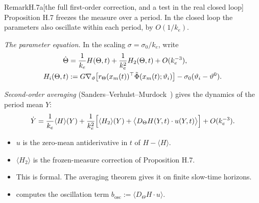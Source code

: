 \begin{rmk}{Remark}{H.7a}[the full first-order correction, and a test in the real closed loop]
Proposition H.7 freezes the measure over a period. In the closed loop the parameters also oscillate within each period,
by $O(1/k_e)$.

\emph{The parameter equation.} In the scaling $\sigma=\sigma_0/k_e$, write
\begin{align}
  \dot\Theta &= \frac{1}{k_e}H(\Theta,t) + \frac{1}{k_e^2}H_2(\Theta,t) + O(k_e^{-3}),\label{eq:finitegain:Theta}\\
  H_i(\Theta,t) &:= G\nabla_\vartheta\bigl[r_\Theta(x_m(t))^\top\tilde\Phi(x_m(t);\vartheta_i)\bigr]
    - \sigma_0(\vartheta_i-\vartheta^0).\notag
\end{align}

\emph{Second-order averaging} (Sanders--Verhulst--Murdock~\cite[\S2.9]{svm2007}) gives the dynamics of the period
mean $Y$:
\begin{equation}\label{eq:finitegain:Y}
  \dot Y = \frac{1}{k_e}\langle H\rangle(Y)
    + \frac{1}{k_e^2}\Bigl[\langle H_2\rangle(Y) + \bigl\langle D_\Theta H(Y,t)\cdot u(Y,t)\bigr\rangle\Bigr]
    + O(k_e^{-3}).
\end{equation}
\begin{itemize}
  \item $u$ is the zero-mean antiderivative in $t$ of $H-\langle H\rangle$.
  \item $\langle H_2\rangle$ is the frozen-measure correction of Proposition H.7.
  \item This is formal. The averaging theorem gives it on finite slow-time horizons.
  \item {} computes the oscillation term
    $b_{\mathrm{osc}} := \langle D_\Theta H\cdot u\rangle$.
\end{itemize}


\end{rmk}
